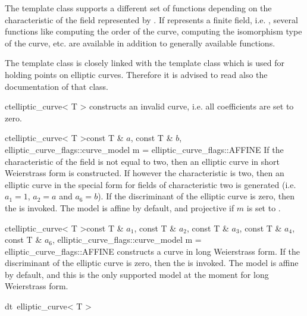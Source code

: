 The template class  supports a different set of functions depending on
the characteristic of the field represented by .  If  represents a finite field,
i.e.  , several functions like computing the order of the curve, computing the
isomorphism type of the curve, etc. are available in addition to generally available functions.

The template class  is closely linked with the template class
 which is used for holding points on elliptic curves.  Therefore it is advised
to read also the documentation of that class.



\CONS

\begin{fcode}{ct}{elliptic_curve< T >}{}
  constructs an invalid curve, i.e. all coefficients are set to zero.
\end{fcode}

\begin{fcode}{ct}{elliptic_curve< T >}{const T & $a$, const T & $b$,
    elliptic_curve_flags::curve_model m = elliptic_curve_flags::AFFINE}%
  If the characteristic of the field is not equal to two, then an elliptic curve in short
  Weierstrass form is constructed.  If however the characteristic is two, then an elliptic curve
  in the special form for fields of characteristic two is generated (i.e. $a_1 = 1$, $a_2 = a$
  and $a_6 = b$).  If the discriminant of the elliptic curve is zero, then the \LEH is invoked.
  The model is affine by default, and projective if $m$ is set to
  .
\end{fcode}

\begin{fcode}{ct}{elliptic_curve< T >}{const T & $a_1$, const T & $a_2$, const T & $a_3$,
    const T & $a_4$, const T & $a_6$,
    elliptic_curve_flags::curve_model m = elliptic_curve_flags::AFFINE}%
  constructs a curve in long Weierstrass form.  If the discriminant of the elliptic curve is
  zero, then the \LEH is invoked.  The model is affine by default, and this is the only
  supported model at the moment for long Weierstrass form.
\end{fcode}

\begin{fcode}{dt}{~elliptic_curve< T >}{}
\end{fcode}


